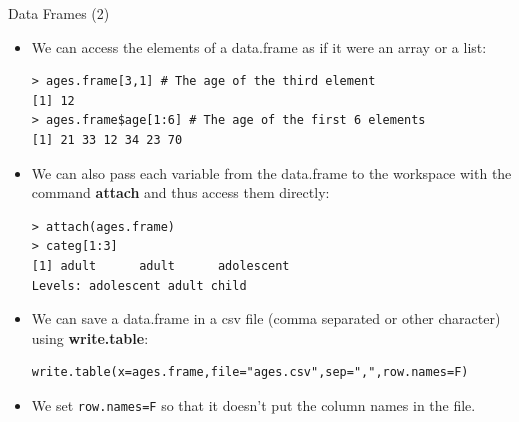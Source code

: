\documentclass[handout]{beamer}
\begin{document}
\begin{frame}[fragile]{Data Frames (2)}
\scriptsize{ 
\begin{itemize}
 \item We can access the elements of a data.frame as if it were an array or a list:
 \begin{verbatim}
> ages.frame[3,1] # The age of the third element
[1] 12
> ages.frame$age[1:6] # The age of the first 6 elements
[1] 21 33 12 34 23 70
 \end{verbatim}
 
\item We can also pass each variable from the data.frame to the workspace with the command \textbf{attach} and thus access them directly:
\begin{verbatim}
> attach(ages.frame)
> categ[1:3]
[1] adult      adult      adolescent
Levels: adolescent adult child
\end{verbatim}

\item We can save a data.frame in a csv file (comma separated or other character) using \textbf{write.table}:
\begin{verbatim}
write.table(x=ages.frame,file="ages.csv",sep=",",row.names=F) 
\end{verbatim}

\item We set \verb+row.names=F+ so that it doesn't put the column names in the file.

 
\end{itemize}
 
}
\end{frame}
\end{document}

